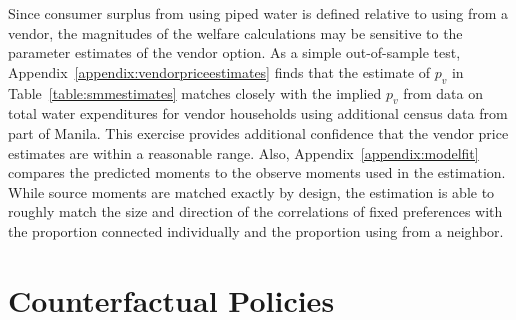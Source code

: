 \documentclass[12pt]{article}
\begin{document}
Since consumer surplus from using piped water is defined relative to using from a vendor, the magnitudes of the welfare calculations may be sensitive to the parameter estimates of the vendor option.  As a simple out-of-sample test, Appendix~\ref{appendix:vendorpriceestimates} finds that the estimate of $p_v$ in Table~\ref{table:smmestimates} matches closely with the implied $p_v$ from data on total water expenditures for vendor households using additional census data from part of Manila.  This exercise provides additional confidence that the vendor price estimates are within a reasonable range.  Also, Appendix~\ref{appendix:modelfit} compares the predicted moments to the observe moments used in the estimation.  While source moments are matched exactly by design, the estimation is able to roughly match the size and direction of the correlations of fixed preferences with the proportion connected individually and the proportion using from a neighbor.

\section{Counterfactual Policies}\label{section:counterfactualexercises}
\end{document}
